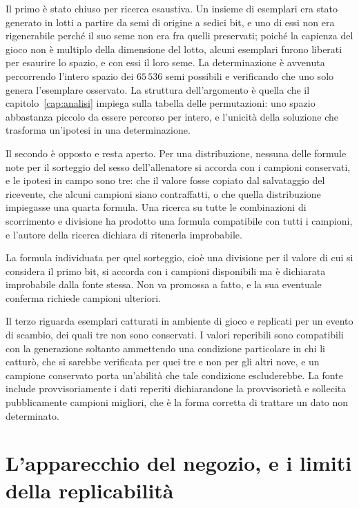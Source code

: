 Il primo è stato chiuso per ricerca esaustiva. Un insieme di esemplari era stato generato in lotti a partire da semi di origine a sedici bit, e uno di essi non era rigenerabile perché il suo seme non era fra quelli preservati; poiché la capienza del gioco non è multiplo della dimensione del lotto, alcuni esemplari furono liberati per esaurire lo spazio, e con essi il loro seme. La determinazione è avvenuta percorrendo l'intero spazio dei $65\,536$ semi possibili e verificando che uno solo genera l'esemplare osservato. La struttura dell'argomento è quella che il capitolo~\ref{cap:analisi} impiega sulla tabella delle permutazioni: uno spazio abbastanza piccolo da essere percorso per intero, e l'unicità della soluzione che trasforma un'ipotesi in una determinazione.

Il secondo è opposto e resta aperto. Per una distribuzione, nessuna delle formule note per il sorteggio del sesso dell'allenatore si accorda con i campioni conservati, e le ipotesi in campo sono tre: che il valore fosse copiato dal salvataggio del ricevente, che alcuni campioni siano contraffatti, o che quella distribuzione impiegasse una quarta formula. Una ricerca su tutte le combinazioni di scorrimento e divisione ha prodotto una formula compatibile con tutti i campioni, e l'autore della ricerca dichiara di ritenerla improbabile.

\begin{daverificare}
La formula individuata per quel sorteggio, cioè una divisione per il valore  di cui si considera il primo bit, si accorda con i campioni disponibili ma è dichiarata improbabile dalla fonte stessa. Non va promossa a fatto, e la sua eventuale conferma richiede campioni ulteriori.
\end{daverificare}

Il terzo riguarda esemplari catturati in ambiente di gioco e replicati per un evento di scambio, dei quali tre non sono conservati. I valori reperibili sono compatibili con la generazione soltanto ammettendo una condizione particolare in chi li catturò, che si sarebbe verificata per quei tre e non per gli altri nove, e un campione conservato porta un'abilità che tale condizione escluderebbe. La fonte include provvisoriamente i dati reperiti dichiarandone la provvisorietà e sollecita pubblicamente campioni migliori, che è la forma corretta di trattare un dato non determinato.

\section{L'apparecchio del negozio, e i limiti della replicabilità}

